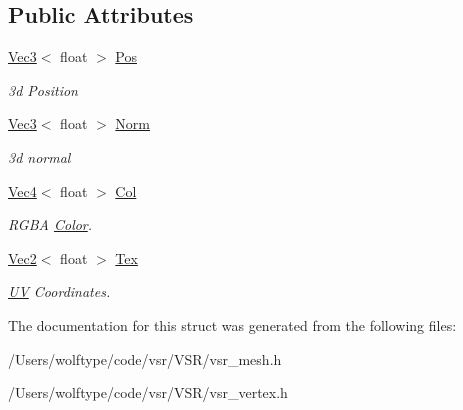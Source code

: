\subsection*{Public Attributes}
\begin{DoxyCompactItemize}
\item 
\hypertarget{structvsr_1_1_vertex_a469e4849dedfeec24d4f7de42c1dc902}{\hyperlink{classvsr_1_1_vec3}{Vec3}$<$ float $>$ \hyperlink{structvsr_1_1_vertex_a469e4849dedfeec24d4f7de42c1dc902}{Pos}}\label{structvsr_1_1_vertex_a469e4849dedfeec24d4f7de42c1dc902}

\begin{DoxyCompactList}\small\item\em 3d Position \end{DoxyCompactList}\item 
\hypertarget{structvsr_1_1_vertex_ad384115a9c8b8848d0d15799a1af3399}{\hyperlink{classvsr_1_1_vec3}{Vec3}$<$ float $>$ \hyperlink{structvsr_1_1_vertex_ad384115a9c8b8848d0d15799a1af3399}{Norm}}\label{structvsr_1_1_vertex_ad384115a9c8b8848d0d15799a1af3399}

\begin{DoxyCompactList}\small\item\em 3d normal \end{DoxyCompactList}\item 
\hypertarget{structvsr_1_1_vertex_a824cb551ea4033fe55730ca3637cb976}{\hyperlink{classvsr_1_1_vec4}{Vec4}$<$ float $>$ \hyperlink{structvsr_1_1_vertex_a824cb551ea4033fe55730ca3637cb976}{Col}}\label{structvsr_1_1_vertex_a824cb551ea4033fe55730ca3637cb976}

\begin{DoxyCompactList}\small\item\em R\-G\-B\-A \hyperlink{classvsr_1_1_color}{Color}. \end{DoxyCompactList}\item 
\hypertarget{structvsr_1_1_vertex_a564f74a31551f0854a49c28df4dcbc3f}{\hyperlink{classvsr_1_1_vec2}{Vec2}$<$ float $>$ \hyperlink{structvsr_1_1_vertex_a564f74a31551f0854a49c28df4dcbc3f}{Tex}}\label{structvsr_1_1_vertex_a564f74a31551f0854a49c28df4dcbc3f}

\begin{DoxyCompactList}\small\item\em \hyperlink{structvsr_1_1_u_v}{U\-V} Coordinates. \end{DoxyCompactList}\end{DoxyCompactItemize}


The documentation for this struct was generated from the following files\-:\begin{DoxyCompactItemize}
\item 
/\-Users/wolftype/code/vsr/\-V\-S\-R/vsr\-\_\-mesh.\-h\item 
/\-Users/wolftype/code/vsr/\-V\-S\-R/vsr\-\_\-vertex.\-h\end{DoxyCompactItemize}
